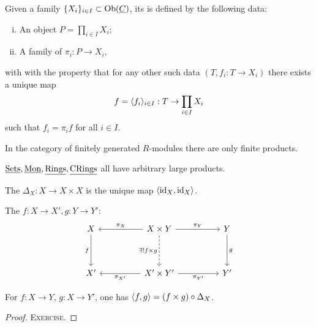 \begin{definition*}
	Given a family \( \{X_i\}_{i \in I} \subset \operatorname{Ob}(\underline{C}) \), its  is defined by the following data:
	\begin{enumerate}[i)]
		\item An object \( P = \prod_{i \in I} X_i \);
		\item A family of  \( \pi_i: P \to X_i \),
	\end{enumerate}
	with with the property that for any other such data \( (T, f_i: T \to X_i) \) there exists a unique map
	\[
		f = \langle f_i \rangle_{i \in I} : T \to \prod_{i \in I} X_i
	\]
	such that \( f_i = \pi_i f \) for all \( i \in I \).
\end{definition*}

\begin{examples*}
	\item In the category of finitely generated \( R \)-modules there are only finite products.
	\item \( \underline{\mathrm{Sets}}, \underline{\mathrm{Mon}}, \underline{\mathrm{Rings}}, \underline{\mathrm{CRings}} \) all have arbitrary large products.
\end{examples*}

\begin{definition*}
	The  \( \Delta_X: X \to X \times X \) is the unique map \( \langle \mathrm{id}_X, \mathrm{id}_X \rangle \).
\end{definition*}

\begin{definition*}
	The  \( f: X \to X', g: Y \to Y' \):
	\[
		\begin{tikzcd}
			X && {X \times Y} && Y \\
			\\
			{X'} && {X' \times Y'} && {Y'}
			\arrow["f"', from=1-1, to=3-1]
			\arrow["{\pi_X}"', from=1-3, to=1-1]
			\arrow["{\pi_Y}", from=1-3, to=1-5]
			\arrow["\exists!{f \times g}"', dashed, from=1-3, to=3-3]
			\arrow["g", from=1-5, to=3-5]
			\arrow["{\pi_{X'}}", from=3-3, to=3-1]
			\arrow["{\pi_{Y'}}"', from=3-3, to=3-5]
		\end{tikzcd}
	\]
\end{definition*}

\begin{proposition*}
	For \( f: X \to Y \), \( g: X \to Y' \), one has \( \langle f, g \rangle = (f \times g) \circ \Delta_X \).
\end{proposition*}
\begin{proof}
	\textsc{Exercise}.
\end{proof}

